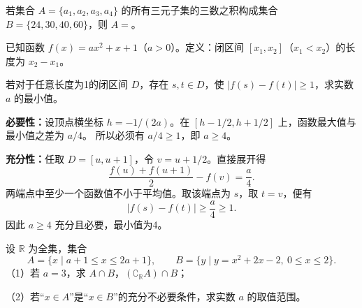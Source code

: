 \begin{frame}
若集合 $A=\{a_1,a_2,a_3,a_4\}$ 的所有三元子集的三数之积构成集合 $B=\{24,30,40,60\}$，则 $A=$\underline{\hspace{3cm}}。
\pause
{}
\end{frame}

\begin{frame}
已知函数 $f(x)=ax^2+x+1$（$a>0$）。定义：闭区间 $[x_1,x_2]$（$x_1<x_2$）的长度为 $x_2-x_1$。
\par\vspace{3mm}
若对于任意长度为1的闭区间 $D$，存在 $s,t\in D$，使 $|f(s)-f(t)|\ge1$，求实数 $a$ 的最小值\underline{\hspace{2cm}}。
\pause
{}
\end{frame}

\begin{frame}
\textbf{必要性：}设顶点横坐标 $h=-1/(2a)$。在 $[h-1/2,h+1/2]$ 上，函数最大值与最小值之差为 $a/4$。
所以必须有 $a/4\ge1$，即 $a\ge4$。
\pause
\par\vspace{3mm}
\textbf{充分性：}任取 $D=[u,u+1]$，令 $v=u+1/2$。直接展开得
\[\frac{f(u)+f(u+1)}2-f(v)=\frac a4.\]
两端点中至少一个函数值不小于平均值。取该端点为 $s$，取 $t=v$，便有
\[|f(s)-f(t)|\ge\frac a4\ge1.\]
因此 $a\ge4$ 充分且必要，最小值为4。
\end{frame}

\begin{frame}
设 $\mathbb R$ 为全集，集合
\[A=\{x\mid a+1\le x\le2a+1\},\qquad
B=\{y\mid y=x^2+2x-2,\ 0\le x\le2\}.\]
（1）若 $a=3$，求 $A\cap B$，$(\complement_{\mathbb R}A)\cap B$；\par
（2）若“$x\in A$”是“$x\in B$”的充分不必要条件，求实数 $a$ 的取值范围。
\pause
{}
\end{frame}

